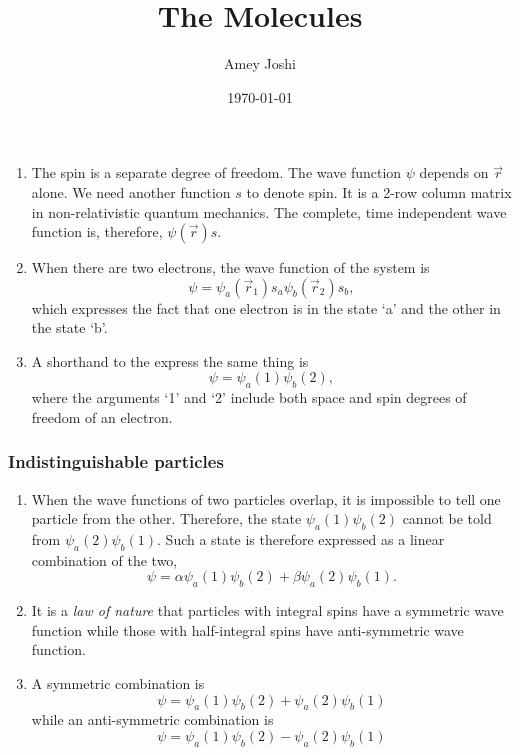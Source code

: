\documentclass{beamer}
\title{The Molecules}
\author{Amey Joshi}
\date{\today}
\begin{document}
\begin{frame}
\titlepage
\end{frame}

\begin{frame}
\begin{enumerate}
\frametitle{Many-electron systems}
\item The spin is a separate degree of freedom. The wave function $\psi$ depends
on $\vec{r}$ alone. We need another function $s$ to denote spin. It is a 2-row
column matrix in non-relativistic quantum mechanics. The complete, time 
independent wave function is, therefore, $\psi(\vec{r})s$.
\item When there are two electrons, the wave function of the system is 
\begin{equation}\label{e1}
\psi = \psi_a(\vec{r}_1)s_a\psi_b(\vec{r}_2)s_b,
\end{equation}
which expresses the fact that one electron is in the state `a' and the other in 
the state `b'.
\item A shorthand to the express the same thing is
\begin{equation}\label{e2}
\psi = \psi_a(1)\psi_b(2),
\end{equation}
where the arguments `1' and `2' include both space and spin degrees of freedom 
of an electron.
\end{enumerate}
\end{frame}

\begin{frame}
\frametitle{Indistinguishable particles}
\begin{enumerate}
\item When the wave functions of two particles overlap, it is impossible to tell
one particle from the other. Therefore, the state $\psi_a(1)\psi_b(2)$ cannot be
told from $\psi_a(2)\psi_b(1)$. Such a state is therefore expressed as a linear
combination of the two,
\begin{equation}\label{e3}
\psi = \alpha\psi_a(1)\psi_b(2) + \beta\psi_a(2)\psi_b(1).
\end{equation}
\item It is a \emph{law of nature} that particles with integral spins have a 
symmetric wave function while those with half-integral spins have anti-symmetric
wave function.
\item A symmetric combination is
\begin{equation}\label{e4}
\psi = \psi_a(1)\psi_b(2) + \psi_a(2)\psi_b(1)
\end{equation}
while an anti-symmetric combination is
\begin{equation}\label{e5}
\psi = \psi_a(1)\psi_b(2) - \psi_a(2)\psi_b(1)
\end{equation}
\end{enumerate}
\end{frame}
\end{document}
